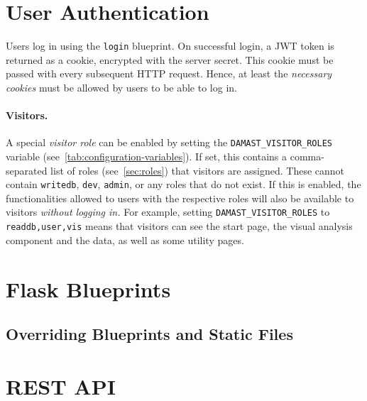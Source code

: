 \section{User Authentication}
\label{sec:user-authentication}

Users log in using the \verb!login! blueprint.
On successful login, a JWT token is returned as a cookie, encrypted with the server secret.
This cookie must be passed with every subsequent HTTP request.
Hence, at least the \emph{necessary cookies} must be allowed by users to be able to log in.

\paragraph*{Visitors.}
\label{sec:visitors}
A special \emph{visitor role} can be enabled by setting the \verb!DAMAST_VISITOR_ROLES! variable (see~\cref{tab:configuration-variables}).
If set, this contains a comma-separated list of roles (see~\cref{sec:roles}) that visitors are assigned.
These cannot contain \verb!writedb!, \verb!dev!, \verb!admin!, or any roles that do not exist.
If this is enabled, the functionalities allowed to users with the respective roles will also be available to visitors \emph{without logging in.}
For example, setting \verb!DAMAST_VISITOR_ROLES! to \verb!readdb,user,vis! means that visitors can see the start page, the visual analysis component and the data, as well as some utility pages.


\section{Flask Blueprints}


\subsection{Overriding Blueprints and Static Files}
\label{sec:override-blueprints}


\section{REST API}
\label{sec:rest-api}

